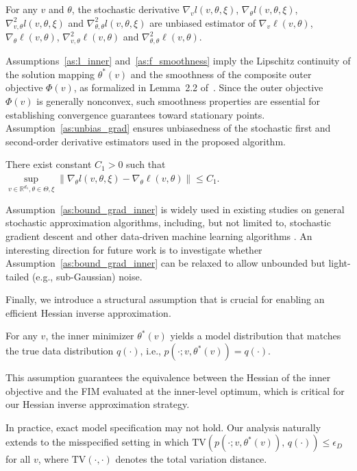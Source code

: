\documentclass[11 pt]{article}
\begin{document}
\begin{assumption}\label{as:unbias_grad}

    For any $v$ and $\theta$, the stochastic derivative $\nabla_vl(v,\theta,\xi)$, $\nabla_\theta l(v,\theta,\xi)$, $\nabla_{v,\theta}^2l(v,\theta,\xi)$ and $\nabla_{\theta,\theta}^2l(v,\theta,\xi)$ are unbiased estimator of $\nabla_v\ell(v,\theta)$, $\nabla_\theta\ell(v,\theta)$, $\nabla_{v,\theta}^2\ell(v,\theta)$ and $\nabla_{\theta,\theta}^2\ell(v,\theta)$.
\end{assumption}

Assumptions~\ref{as:l_inner} and~\ref{as:f_smoothness} imply the Lipschitz continuity of the solution mapping $\theta^*(v)$ and the smoothness of the composite outer objective $\Phi(v)$, as formalized in Lemma~2.2 of~\citet{ghadimi2018approximation}. Since the outer objective $\Phi(v)$ is generally nonconvex, such smoothness properties are essential for establishing convergence guarantees toward stationary points. Assumption~\ref{as:unbias_grad} ensures unbiasedness of the stochastic first and second-order derivative estimators used in the proposed algorithm.


\begin{assumption}\label{as:bound_grad_inner}
There exist  constant $C_1>0$ such that $ \sup\limits_{v\in \mathbb{R}^{d_1},\theta\in \Theta,\xi} \| \nabla_\theta  l(v,\theta,\xi)- \nabla_\theta \ell(v,\theta)\| \leq C_1.$
\end{assumption}

Assumption~\ref{as:bound_grad_inner} is widely used in existing studies on general stochastic approximation algorithms, including, but not limited to, stochastic gradient descent \cite{karimi2019non} and other data-driven machine learning algorithms \cite{bertsekas1996neuro}. An interesting direction for future work is to investigate whether Assumption~\ref{as:bound_grad_inner} can be relaxed to allow unbounded but light-tailed (e.g., sub-Gaussian) noise.



Finally, we introduce a structural assumption that is crucial for enabling an efficient Hessian inverse approximation.
\begin{assumption}\label{as:inner_dist}
     For any \(v\), the inner minimizer \(\theta^*(v)\) yields a model distribution that matches the true data distribution \(q(\cdot)\), i.e., $p(\cdot; v, \theta^*(v)) = q(\cdot)$.
\end{assumption}
This assumption guarantees the equivalence between the Hessian of the inner objective and the FIM evaluated at the inner-level optimum, which is critical for our Hessian inverse approximation strategy.
\begin{remark}
In practice, exact model specification may not hold. 
Our analysis naturally extends to the misspecified setting in which $\mathrm{TV}\!\left(p(\cdot; v, \theta^*(v)),\, q(\cdot)\right) \le \epsilon_D$ for all $v$,
where \(\mathrm{TV}(\cdot,\cdot)\) denotes the total variation distance. 
\end{remark}
\end{document}
